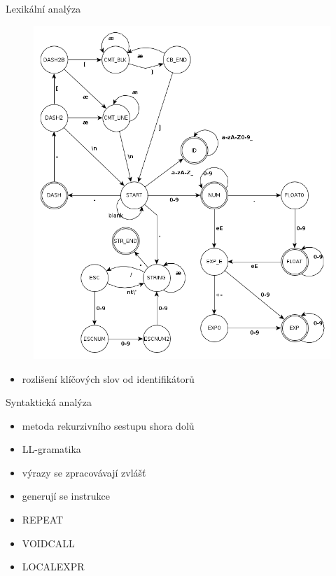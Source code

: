 \documentclass{beamer}
\begin{document}
\begin{frame}{Lexikální analýza}
  \begin{figure}
    \includegraphics[scale=0.25]{lexical.png}
  \end{figure}
  \begin{itemize}
  \item rozlišení klíčových slov od identifikátorů
  \end{itemize}
\end{frame}

\begin{frame}{Syntaktická analýza}
  \begin{itemize}
  \item metoda rekurzivního sestupu shora dolů
  \item LL-gramatika
  \item výrazy se zpracovávají zvlášť
  \item generují se instrukce
  \item REPEAT
  \item VOIDCALL
  \item LOCALEXPR
  \end{itemize}
\end{frame}
\end{document}
